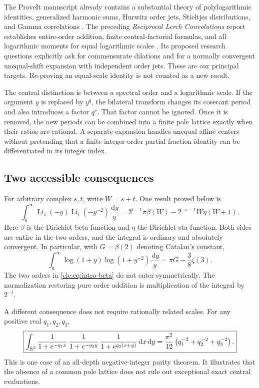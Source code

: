 \documentclass[11pt,a4paper]{article}
\numberwithin{equation}{section}
\theoremstyle{definition}\newtheorem{definition}[theorem]{Definition}
\theoremstyle{remark}\newtheorem{remark}[theorem]{Remark}
\DeclareMathOperator{\Li}{Li}
\newcommand{\dd}{\,\mathrm d}
\begin{document}
The ProveIt manuscript already contains a substantial theory of
polylogarithmic identities, generalized harmonic sums, Hurwitz order
jets, Stieltjes distributions, and Gamma correlations \cite{Repo}.
The preceding \emph{Reciprocal Lerch Convolutions} report establishes
entire-order addition, finite central-factorial formulas, and all
logarithmic moments for equal logarithmic scales \cite{RLC}. Its proposed
research questions explicitly ask for commensurate dilations and for a
normally convergent unequal-shift expansion with independent order jets.
These are our principal targets. Re-proving an equal-scale identity is not
counted as a new result.

The central distinction is between a spectral order and a logarithmic
scale. If the argument $y$ is replaced by $y^q$, the bilateral transform
changes its cosecant period and also introduces a factor $q^s$. That
factor cannot be ignored. Once it is removed, the new periods can be
combined into a finite pole lattice exactly when their ratios are rational.
A separate expansion handles unequal affine centers without pretending
that a finite integer-order partial fraction identity can be differentiated
in its integer index.

\subsection{Two accessible consequences}
For arbitrary complex $s,t$, write $W=s+t$. One result proved below is
\begin{equation}\label{clc:eq:intro-beta}
 \boxed{\displaystyle
 \int_0^\infty \Li_s(-y)\Li_t(-y^{-2})\frac{\dd y}{y}
 =2^{t-1}\pi\beta(W)-2^{-s-1}W\eta(W+1).}
\end{equation}
Here $\beta$ is the Dirichlet beta function and $\eta$ the Dirichlet eta
function. Both sides are entire in the two orders, and the integral is
ordinary and absolutely convergent. In particular, with
$G=\beta(2)$ denoting Catalan's constant,
\begin{equation}\label{clc:eq:intro-log}
 \int_0^\infty \log(1+y)\log(1+y^{-2})\frac{\dd y}{y}
 =\pi G-\frac38\zeta(3).
\end{equation}
The two orders in \eqref{clc:eq:intro-beta} do not enter symmetrically.
The normalization restoring pure order addition is multiplication of the
integral by $2^{-t}$.

A different consequence does not require rationally related scales.
For any positive real $q_1,q_2,q_3$,
\begin{equation}\label{clc:eq:intro-cubic}
 \boxed{\displaystyle
 \int_{\R^2}
 \frac{1}{1+e^{-q_1x}}\,
 \frac{1}{1+e^{-q_2y}}\,
 \frac{1}{1+e^{q_3(x+y)}}\dd x\dd y
 =\frac{\pi^2}{12}\left(q_1^{-2}+q_2^{-2}+q_3^{-2}\right).}
\end{equation}
This is one case of an all-depth negative-integer parity theorem. It
illustrates that the absence of a common pole lattice does not rule out
exceptional exact central evaluations.
\end{document}
